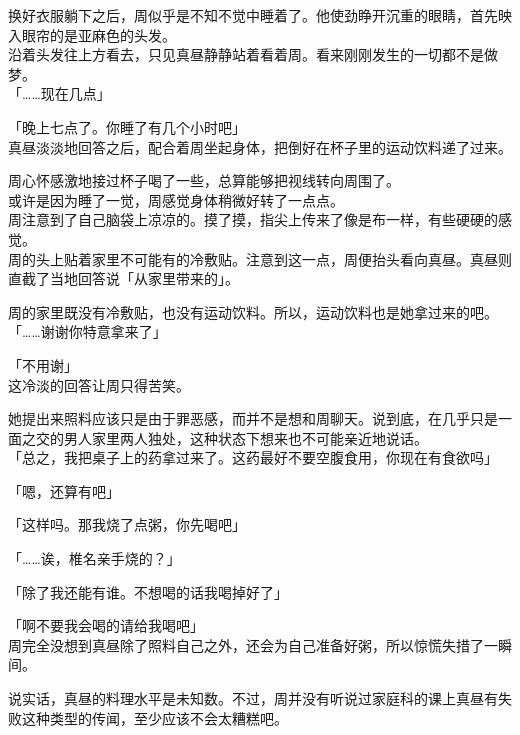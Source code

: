 \vspace{2\baselineskip}

换好衣服躺下之后，周似乎是不知不觉中睡着了。他使劲睁开沉重的眼睛，首先映入眼帘的是亚麻色的头发。\\

沿着头发往上方看去，只见真昼静静站着看着周。看来刚刚发生的一切都不是做梦。\\

「……现在几点」

「晚上七点了。你睡了有几个小时吧」\\

真昼淡淡地回答之后，配合着周坐起身体，把倒好在杯子里的运动饮料递了过来。

周心怀感激地接过杯子喝了一些，总算能够把视线转向周围了。\\

或许是因为睡了一觉，周感觉身体稍微好转了一点点。\\

周注意到了自己脑袋上凉凉的。摸了摸，指尖上传来了像是布一样，有些硬硬的感觉。\\

周的头上贴着家里不可能有的冷敷贴。注意到这一点，周便抬头看向真昼。真昼则直截了当地回答说「从家里带来的」。

周的家里既没有冷敷贴，也没有运动饮料。所以，运动饮料也是她拿过来的吧。\\

「……谢谢你特意拿来了」

「不用谢」\\

这冷淡的回答让周只得苦笑。

她提出来照料应该只是由于罪恶感，而并不是想和周聊天。说到底，在几乎只是一面之交的男人家里两人独处，这种状态下想来也不可能亲近地说话。\\

「总之，我把桌子上的药拿过来了。这药最好不要空腹食用，你现在有食欲吗」

「嗯，还算有吧」

「这样吗。那我烧了点粥，你先喝吧」

「……诶，椎名亲手烧的？」

「除了我还能有谁。不想喝的话我喝掉好了」

「啊不要我会喝的请给我喝吧」\\

周完全没想到真昼除了照料自己之外，还会为自己准备好粥，所以惊慌失措了一瞬间。

说实话，真昼的料理水平是未知数。不过，周并没有听说过家庭科的课上真昼有失败这种类型的传闻，至少应该不会太糟糕吧。\\

